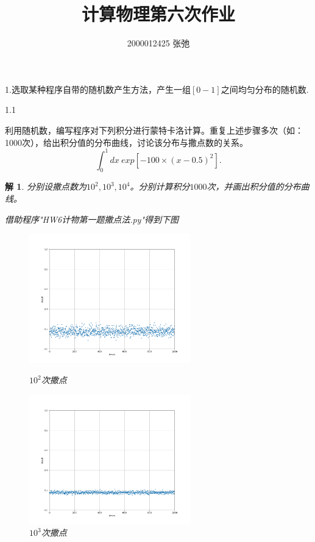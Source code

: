 \documentclass[10pt]{ctexart}
\author{2000012425 张弛}
\title{计算物理第六次作业}
\newtheorem*{solution}{解}
\begin{document}
\maketitle
1.选取某种程序自带的随机数产生方法，产生一组$[0-1]$之间均匀分布的随机数.

1.1

利用随机数，编写程序对下列积分进行蒙特卡洛计算。重复上述步骤多次（如：1000次），给出积分值的分布曲线，讨论该分布与撒点数的关系。
$$\int_{0}^{1}dx\ exp[-100\times(x-0.5)^2].$$
\begin{solution}
    分别设撒点数为$10^2,10^3,10^4$。分别计算积分$1000$次，并画出积分值的分布曲线。

    借助程序"HW6计物第一题撒点法.py"得到下图
    \begin{figure}[H]
        \centering
        \begin{minipage}{0.45\linewidth}
            \centering
            \includegraphics[width=7cm]{sprinkle_100.png}
            \caption{$10^2$次撒点}
        \end{minipage}
        \qquad
        \begin{minipage}{0.45\linewidth}
            \centering
            \includegraphics[width=7cm]{sprinkle_1000.png}
            \caption{$10^3$次撒点}
        \end{minipage}
    \end{figure}
    \begin{figure}[H]
        \centering

\end{figure}
\end{solution}
\end{document}
